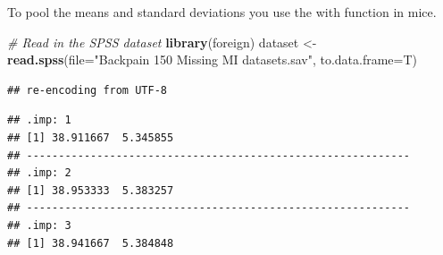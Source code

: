 \documentclass[
]{book}
\newenvironment{Shaded}{\begin{snugshade}}{\end{snugshade}}
\newcommand{\CommentTok}[1]{\textcolor[rgb]{0.56,0.35,0.01}{\textit{#1}}}
\newcommand{\ControlFlowTok}[1]{\textcolor[rgb]{0.13,0.29,0.53}{\textbf{#1}}}
\newcommand{\DataTypeTok}[1]{\textcolor[rgb]{0.13,0.29,0.53}{#1}}
\newcommand{\DecValTok}[1]{\textcolor[rgb]{0.00,0.00,0.81}{#1}}
\newcommand{\KeywordTok}[1]{\textcolor[rgb]{0.13,0.29,0.53}{\textbf{#1}}}
\newcommand{\NormalTok}[1]{#1}
\newcommand{\OperatorTok}[1]{\textcolor[rgb]{0.81,0.36,0.00}{\textbf{#1}}}
\newcommand{\OtherTok}[1]{\textcolor[rgb]{0.56,0.35,0.01}{#1}}
\newcommand{\StringTok}[1]{\textcolor[rgb]{0.31,0.60,0.02}{#1}}
\begin{document}
To pool the means and standard deviations you use the with function in mice.

\begin{Shaded}
\begin{Highlighting}[]
\CommentTok{# Read in the SPSS dataset}
\KeywordTok{library}\NormalTok{(foreign)}
\NormalTok{dataset <-}\StringTok{ }\KeywordTok{read.spss}\NormalTok{(}\DataTypeTok{file=}\StringTok{"Backpain 150 Missing MI datasets.sav"}\NormalTok{, }\DataTypeTok{to.data.frame=}\NormalTok{T)}
\end{Highlighting}
\end{Shaded}

\begin{verbatim}
## re-encoding from UTF-8
\end{verbatim}

\begin{Shaded}
\end{Shaded}

\begin{verbatim}
## .imp: 1
## [1] 38.911667  5.345855
## ------------------------------------------------------------ 
## .imp: 2
## [1] 38.953333  5.383257
## ------------------------------------------------------------ 
## .imp: 3
## [1] 38.941667  5.384848
\end{verbatim}
\end{document}
